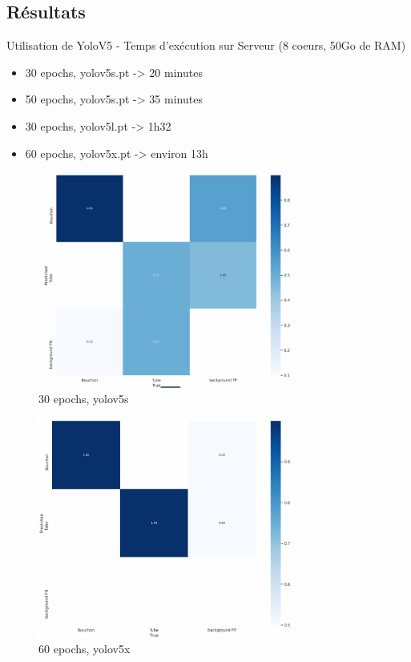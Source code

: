 \documentclass[12pt]{beamer}
\begin{document}
	\subsection{Résultats}
    \begin{frame}[allowframebreaks]
        \begin{block}{Utilisation de YoloV5 - Temps d'exécution sur Serveur (8 coeurs, 50Go de RAM)}
	        \begin{itemize}
	            [triangle]
	            \item 30 epochs, yolov5s.pt -> 20 minutes 
	            \item 50 epochs, yolov5s.pt -> 35 minutes
	            \item 30 epochs, yolov5l.pt -> 1h32
	            \item 60 epochs, yolov5x.pt -> environ 13h
	        \end{itemize}
	    \end{block}
    
    
	    \begin{figure}
		    \centering
		    \includegraphics[width=0.75\textwidth]{image/confusionsMatrix.png}
		    \caption*{30 epochs, yolov5s}
	    \end{figure}
	    
	    \begin{figure}
		    \centering
		    \includegraphics[width=0.75\textwidth]{image/confusionMatrixBest.png}
		    \caption*{60 epochs, yolov5x}
	    \end{figure}
	    

\end{frame}
\end{document}
